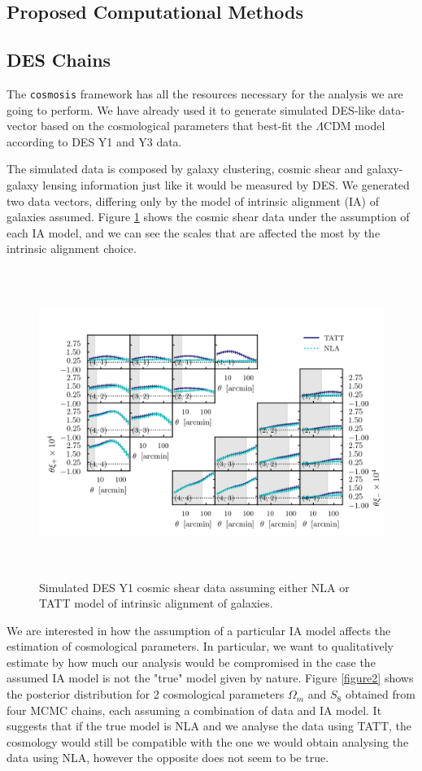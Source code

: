 \documentclass[12pt]{article}
\begin{document}
\begin{small}
\section{Proposed Computational Methods}
\subsection{DES Chains}

The {\tt cosmosis} framework has all the resources necessary for the analysis we are going to perform. We have already used it to generate simulated DES-like data-vector based on the cosmological parameters that best-fit the $\Lambda$CDM model according to DES Y1 and Y3 data. 

The simulated data is composed by galaxy clustering, cosmic shear and galaxy-galaxy lensing information just like it would be measured by DES. We generated two data vectors, differing only by the model of intrinsic alignment (IA) of galaxies assumed. Figure \ref{figure1} shows the cosmic shear data under the assumption of each IA model, and we can see the scales that are affected the most by the intrinsic alignment choice.
 
\begin{figure}[!h]
\begin{center}
\includegraphics[height=10cm]{xipm_NLA_TATT.png}
\end{center}
 \caption{Simulated DES Y1 cosmic shear data assuming either NLA or TATT model of intrinsic alignment of galaxies.}
\label{figure1}
\end{figure}

We are interested in how the assumption of a particular IA model affects the estimation of cosmological parameters. In particular, we want to qualitatively estimate by how much our analysis would be compromised in the case the assumed IA model is not the "true" model given by nature. Figure \ref{figure2} shows the posterior distribution for 2 cosmological parameters $\Omega_m$ and $S_8$ obtained from four MCMC chains, each assuming a combination of data and IA model. It suggests that if the true model is NLA and we analyse the data using TATT, the cosmology would still be compatible with the one we would obtain analysing the data using NLA, however the opposite does not seem to be true.


\end{small}
\end{document}
